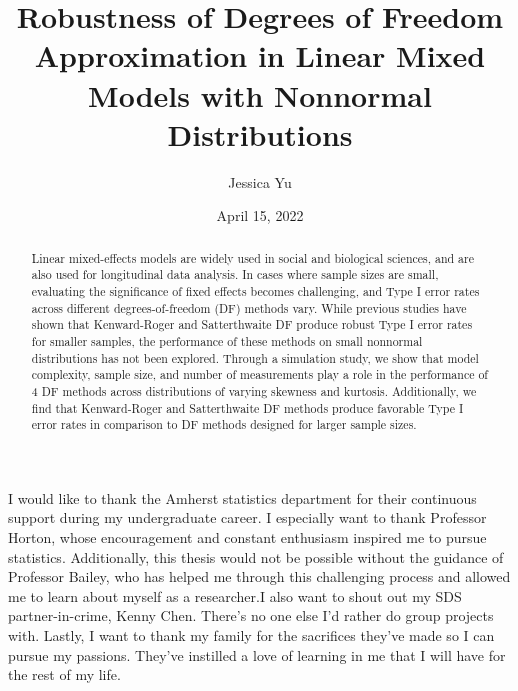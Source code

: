 \documentclass[12pt, twoside]{amherstthesis}
\title{Robustness of Degrees of Freedom Approximation in Linear Mixed Models with Nonnormal Distributions}
\author{Jessica Yu}
\date{April 15, 2022}
\begin{document}
\doublespace
  \maketitle

\frontmatter %
\pagestyle{fancyplain}

  \begin{abstract}
    Linear mixed-effects models are widely used in social and biological sciences, and are also used for longitudinal data analysis. In cases where sample sizes are small, evaluating the significance of fixed effects becomes challenging, and Type I error rates across different degrees-of-freedom (DF) methods vary. While previous studies have shown that Kenward-Roger and Satterthwaite DF produce robust Type I error rates for smaller samples, the performance of these methods on small nonnormal distributions has not been explored. Through a simulation study, we show that model complexity, sample size, and number of measurements play a role in the performance of 4 DF methods across distributions of varying skewness and kurtosis. Additionally, we find that Kenward-Roger and Satterthwaite DF methods produce favorable Type I error rates in comparison to DF methods designed for larger sample sizes.
  \end{abstract}
  \begin{acknowledgments}
    I would like to thank the Amherst statistics department for their continuous support during my undergraduate career. I especially want to thank Professor Horton, whose encouragement and constant enthusiasm inspired me to pursue statistics. Additionally, this thesis would not be possible without the guidance of Professor Bailey, who has helped me through this challenging process and allowed me to learn about myself as a researcher.I also want to shout out my SDS partner-in-crime, Kenny Chen. There's no one else I'd rather do group projects with.
    Lastly, I want to thank my family for the sacrifices they've made so I can pursue my passions. They've instilled a love of learning in me that I will have for the rest of my life.
  \end{acknowledgments}

  \hypersetup{linkcolor=black}
  \setcounter{tocdepth}{2}
  \tableofcontents

  \listoftables
\end{document}
